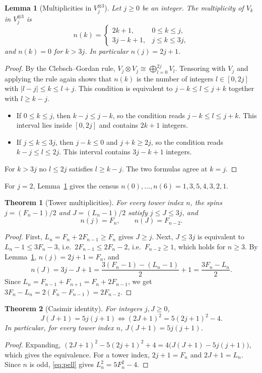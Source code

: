 \documentclass[11pt]{amsart}
\newtheorem{theorem}{Theorem}
\newtheorem{lemma}{Lemma}[section]
\theoremstyle{definition}
\theoremstyle{remark}
\begin{document}
\begin{lemma}[Multiplicities in $V_j^{\otimes 3}$]\label{lem:mult}
Let $j\ge 0$ be an integer. The multiplicity of $V_k$ in $V_j^{\otimes 3}$ is
\[
n(k)=\begin{cases}2k+1,& 0\le k\le j,\\ 3j-k+1,& j\le k\le 3j,\end{cases}
\]
and $n(k)=0$ for $k>3j$. In particular $n(j)=2j+1$.
\end{lemma}
\begin{proof}
By the Clebsch--Gordan rule, $V_j\otimes V_j\cong\bigoplus_{l=0}^{2j}V_l$. Tensoring with $V_j$ and applying the rule again shows that $n(k)$ is the number of integers $l\in[0,2j]$ with $|l-j|\le k\le l+j$. This condition is equivalent to $j-k\le l\le j+k$ together with $l\ge k-j$.
\begin{itemize}
\item If $0\le k\le j$, then $k-j\le j-k$, so the condition reads $j-k\le l\le j+k$. This interval lies inside $[0,2j]$ and contains $2k+1$ integers.
\item If $j\le k\le 3j$, then $j-k\le 0$ and $j+k\ge 2j$, so the condition reads $k-j\le l\le 2j$. This interval contains $3j-k+1$ integers.
\end{itemize}
For $k>3j$ no $l\le 2j$ satisfies $l\ge k-j$. The two formulas agree at $k=j$.
\end{proof}

For $j=2$, Lemma~\ref{lem:mult} gives the census $n(0),\dots,n(6)=1,3,5,4,3,2,1$.

\begin{theorem}[Tower multiplicities]\label{thm:A}
For every tower index $n$, the spins $j=(F_n-1)/2$ and $J=(L_n-1)/2$ satisfy $j\le J\le 3j$, and
\[
n(j)=F_n,\qquad n(J)=F_{n-2}.
\]
\end{theorem}
\begin{proof}
First, $L_n=F_n+2F_{n-1}\ge F_n$ gives $J\ge j$. Next, $J\le 3j$ is equivalent to $L_n-1\le 3F_n-3$, i.e.\ $2F_{n-1}\le 2F_n-2$, i.e.\ $F_{n-2}\ge 1$, which holds for $n\ge 3$. By Lemma~\ref{lem:mult}, $n(j)=2j+1=F_n$, and
\[
n(J)=3j-J+1=\frac{3(F_n-1)-(L_n-1)}{2}+1=\frac{3F_n-L_n}{2}.
\]
Since $L_n=F_{n-1}+F_{n+1}=F_n+2F_{n-1}$, we get $3F_n-L_n=2(F_n-F_{n-1})=2F_{n-2}$.
\end{proof}

\begin{theorem}[Casimir identity]\label{thm:B}
For integers $j,J\ge 0$,
\[
J(J+1)=5j(j+1)\iff(2J+1)^2=5(2j+1)^2-4.
\]
In particular, for every tower index $n$, $J(J+1)=5j(j+1)$.
\end{theorem}
\begin{proof}
Expanding, $(2J+1)^2-5(2j+1)^2+4=4\bigl(J(J+1)-5j(j+1)\bigr)$, which gives the equivalence. For a tower index, $2j+1=F_n$ and $2J+1=L_n$. Since $n$ is odd, \eqref{eq:pell} gives $L_n^2=5F_n^2-4$.
\end{proof}
\end{document}
